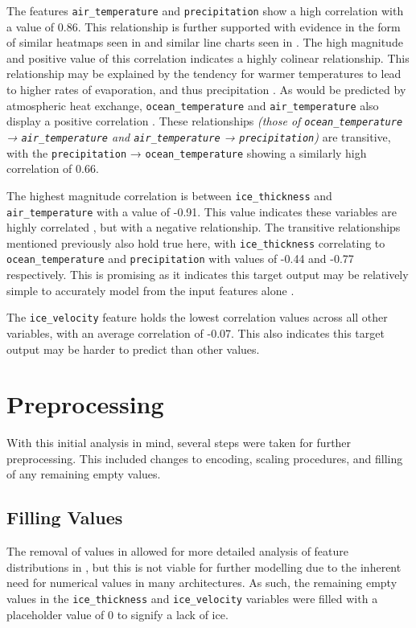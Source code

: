 The features \texttt{air\_temperature} and \texttt{precipitation}  show a high correlation with a value of 0.86. This relationship is further supported with evidence in the form of similar heatmaps seen in  and similar line charts seen in . The high magnitude and positive value of this correlation indicates a highly colinear relationship. This relationship may be explained by the tendency for warmer temperatures to lead to higher rates of evaporation, and thus precipitation  \cite{Nicola2023}.  As would be predicted by atmospheric heat exchange, \texttt{ocean\_temperature} and \texttt{air\_temperature} also display a positive correlation \cite{Bromwich1990}. These relationships \textit{(those of \texttt{ocean\_temperature} → \texttt{air\_temperature} and \texttt{air\_temperature} → \texttt{precipitation})} are transitive, with the \texttt{precipitation} → \texttt{ocean\_temperature} showing a similarly high correlation of 0.66.

The highest magnitude correlation is between \texttt{ice\_thickness} and \texttt{air\_temperature} with a value of -0.91. This value indicates these variables are highly correlated , but with a negative relationship. The transitive relationships mentioned previously also hold true here, with \texttt{ice\_thickness} correlating to \texttt{ocean\_temperature} and \texttt{precipitation} with values of -0.44 and -0.77 respectively. This is promising as it indicates this target output may be relatively simple to accurately model from the input features alone \cite{Hall2000}.

The \texttt{ice\_velocity} feature holds the lowest correlation values across all other variables, with an average correlation of -0.07.  This also indicates this target output may be harder to predict than other values.

\section{Preprocessing}

With this initial analysis in mind, several steps were taken for further preprocessing. This included changes to encoding, scaling procedures, and filling of any remaining empty values. 

\subsection{Filling Values}

The removal of values in  allowed for more detailed analysis of feature distributions in , but this is not viable for further modelling due to the inherent need for numerical values in many architectures. As such, the remaining empty values in the \texttt{ice\_thickness} and \texttt{ice\_velocity} variables were filled with a placeholder value of 0 to signify a lack of ice. 

